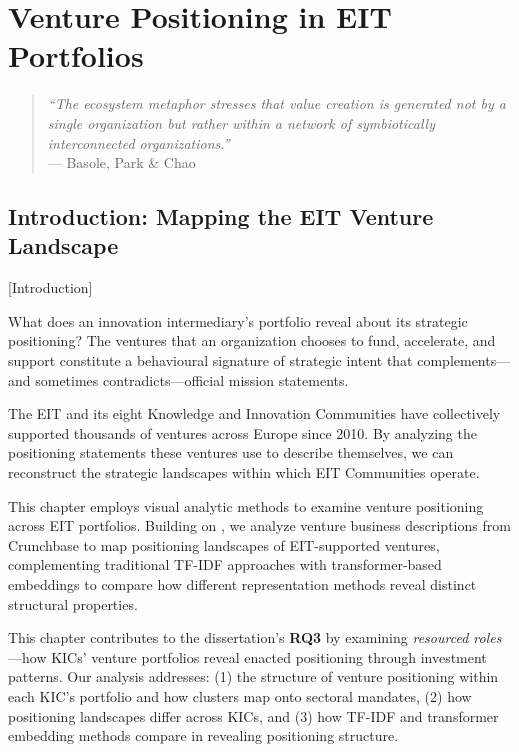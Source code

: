 \documentclass[../main.tex]{subfiles}
\begin{document}
\chapter{Venture Positioning in EIT Portfolios}
\margintoc

\begin{quote}
\textit{``The ecosystem metaphor stresses that value creation is generated not by a single organization but rather within a network of symbiotically interconnected organizations.''}\\
--- Basole, Park \& Chao \cite{basole2019visual}
\end{quote}

\section{Introduction: Mapping the EIT Venture Landscape}[Introduction]

What does an innovation intermediary's portfolio reveal about its strategic positioning? The ventures that an organization chooses to fund, accelerate, and support constitute a behavioural signature of strategic intent that complements---and sometimes contradicts---official mission statements.

The EIT and its eight Knowledge and Innovation Communities have collectively supported thousands of ventures across Europe since 2010. By analyzing the positioning statements these ventures use to describe themselves, we can reconstruct the strategic landscapes within which EIT Communities operate.

This chapter employs visual analytic methods to examine venture positioning across EIT portfolios. Building on \cite{basole2019visual}, we analyze venture business descriptions from Crunchbase to map positioning landscapes of EIT-supported ventures, complementing traditional TF-IDF approaches with transformer-based embeddings to compare how different representation methods reveal distinct structural properties.

This chapter contributes to the dissertation's \textbf{RQ3} by examining \emph{resourced roles}---how KICs' venture portfolios reveal enacted positioning through investment patterns. Our analysis addresses: (1) the structure of venture positioning within each KIC's portfolio and how clusters map onto sectoral mandates, (2) how positioning landscapes differ across KICs, and (3) how TF-IDF and transformer embedding methods compare in revealing positioning structure.
\end{document}
